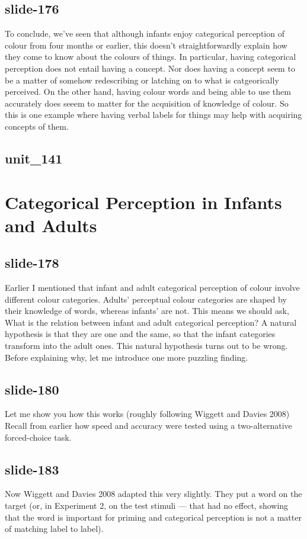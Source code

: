 \documentclass[12pt,\papersize]{extarticle}
\begin{document}
 
\subsection{slide-176}
To conclude, we've seen that although infants enjoy categorical perception of colour from four months or earlier,
this doesn't straightforwardly explain how they come to know about the colours of things.
In particular, having categorical perception does not entail having a concept.
Nor does having a concept seem to be a matter of somehow redescribing or latching on to what is catgeorically perceived.
On the other hand, having colour words and being able to use them accurately does seeem to matter for the acquisition of knowledge of colour.
So this is one example where having verbal labels for things may help with acquiring concepts of them.
 
 
\subsection{unit\_141}
 
\section{Categorical Perception in Infants and Adults}
 
 
\subsection{slide-178}
Earlier I mentioned that infant and adult categorical perception of colour involve different colour categories.
Adults’ perceptual colour categories are shaped by their knowledge of words, whereas infants’ are not.
This means we should ask, What is the relation between infant and adult categorical perception?
A natural hypothesis is that they are one and the same, so that the infant categories transform into the adult ones.
This natural hypothesis turns out to be wrong.
Before explaining why, let me introduce one more puzzling finding.
 
 
\subsection{slide-180}
Let me show you how this works (roughly following Wiggett and Davies 2008)
Recall from earlier how speed and accuracy were tested using a two-alternative forced-choice task.
 
 
\subsection{slide-183}
Now Wiggett and Davies 2008 adapted this very slightly.
They put a word on the target (or, in Experiment 2, on the test stimuli --- that had no effect, showing that the word is important for priming and categorical perception is not a matter of matching label to label).
 
\end{document}
